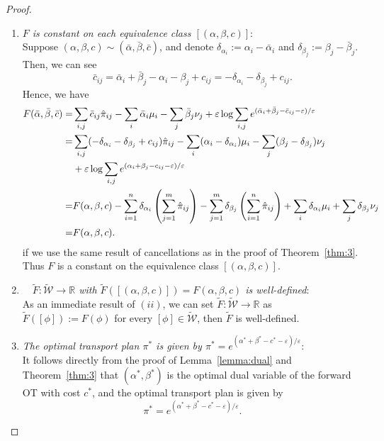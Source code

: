 \begin{proof}
\begin{enumerate}[label=(\roman*)]
		\item \textit{$F$ is constant on each equivalence class $[(\alpha, \beta, c)]$}: \\
		Suppose $(\alpha, \beta, c) \sim (\bar{\alpha}, \bar{\beta}, \bar{c})$, and denote $\delta_{\alpha_i} := \alpha_i - \bar{\alpha}_i$ and $\delta_{\beta_j} := \beta_j - \bar{\beta}_j$. Then, we can see
		\[ \bar{c}_{ij} =\bar{\alpha}_i +\bar{\beta}_j -\alpha_i -\beta_j +c_{ij} = -\delta_{\alpha_i}-\delta_{\beta_j} + c_{ij}. \]
		Hence, we have
		\begin{align*}
			F(\bar{\alpha}, \bar{\beta}, \bar{c}) = & \sum_{i,j} \bar{c}_{ij} \hat{\pi}_{ij} - \sum_i \bar{\alpha}_i \mu_i - \sum_j \bar{\beta}_j \nu_j + \varepsilon \log \sum_{i,j} e^{(\bar{\alpha}_i + \bar{\beta}_j - \bar{c}_{ij} - \varepsilon)/\varepsilon} \\
			=& \sum_{i,j} (-\delta_{\alpha_i} - \delta_{\beta_j} + c_{ij}) \hat{\pi}_{ij} - \sum_i (\alpha_i - \delta_{\alpha_i}) \mu_i - \sum_j (\beta_j - \delta_{\beta_j}) \nu_j \\
			& + \varepsilon \log \sum_{i,j} e^{(\alpha_i + \beta_j - c_{ij}-\varepsilon)/\varepsilon} \\
			=& F(\alpha, \beta, c) - \sum_{i=1}^n \delta_{\alpha_i} \left(\sum_{j=1}^m \hat{\pi}_{ij}\right) - \sum_{j=1}^m \delta_{\beta_j} \left(\sum_{i=1}^n \hat{\pi}_{ij}\right) + \sum_i \delta_{\alpha_i} \mu_i + \sum_j \delta_{\beta_j} \nu_j\\
			=& F(\alpha, \beta, c).
		\end{align*}
		if we use the same result of cancellations as in the proof of Theorem~\ref{thm:3}. Thus $F$ is a constant on the equivalence class $[(\alpha, \beta, c)]$.\par 
		
		\item \textit{$\quad \widetilde{F}: \widetilde{\mathcal{W}} \rightarrow \mathbb{R}$ with $\widetilde{F}([(\alpha, \beta, c)])=F(\alpha, \beta, c)$ is well-defined}:\\
		As an immediate result of $(i i)$, we can set $\widetilde{F}: \widetilde{\mathcal{W}} \rightarrow \mathbb{R}$ as $\widetilde{F}([\phi]):=F(\phi)$ for every $[\phi] \in \widetilde{\mathcal{W}}$, then $\widetilde{F}$ is well-defined.\par 
		
		\item \textit{The optimal transport plan $\pi^{*}$ is given by $\pi^{*}=e^{\left(\alpha^{*}+\beta^{*}-c^{*}-\varepsilon\right) / \varepsilon}$}:\\
		It follows directly from the proof of Lemma~\ref{lemma:dual} and Theorem~\ref{thm:3} that $\left(\alpha^{*}, \beta^{*}\right)$ is the optimal dual variable of the forward OT with cost $c^{*}$, and the optimal transport plan is given by 
		\[\pi^* = e^{\left(\alpha^{*}+\beta^{*}-c^{*}-\varepsilon\right) / \varepsilon}.\]
		

\end{enumerate}
\end{proof}
